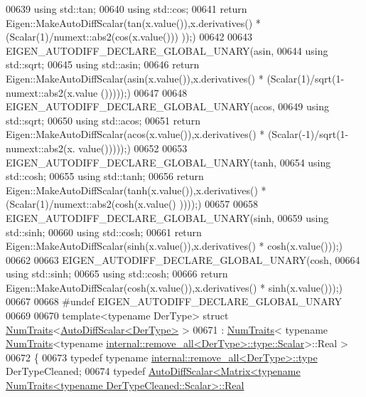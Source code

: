 \begin{DoxyCode}
00639   \textcolor{keyword}{using} std::tan;
00640   \textcolor{keyword}{using} std::cos;
00641   \textcolor{keywordflow}{return} Eigen::MakeAutoDiffScalar(tan(x.value()),x.derivatives() * (Scalar(1)/numext::abs2(cos(x.value()))
      ));)
00642 
00643 EIGEN\_AUTODIFF\_DECLARE\_GLOBAL\_UNARY(asin,
00644   \textcolor{keyword}{using} std::sqrt;
00645   \textcolor{keyword}{using} std::asin;
00646   \textcolor{keywordflow}{return} Eigen::MakeAutoDiffScalar(asin(x.value()),x.derivatives() * (Scalar(1)/sqrt(1-numext::abs2(x.value
      ()))));)
00647   
00648 EIGEN\_AUTODIFF\_DECLARE\_GLOBAL\_UNARY(acos,
00649   \textcolor{keyword}{using} std::sqrt;
00650   \textcolor{keyword}{using} std::acos;
00651   \textcolor{keywordflow}{return} Eigen::MakeAutoDiffScalar(acos(x.value()),x.derivatives() * (Scalar(-1)/sqrt(1-numext::abs2(x.
      value()))));)
00652 
00653 EIGEN\_AUTODIFF\_DECLARE\_GLOBAL\_UNARY(tanh,
00654   \textcolor{keyword}{using} std::cosh;
00655   \textcolor{keyword}{using} std::tanh;
00656   \textcolor{keywordflow}{return} Eigen::MakeAutoDiffScalar(tanh(x.value()),x.derivatives() * (Scalar(1)/numext::abs2(cosh(x.value()
      ))));)
00657 
00658 EIGEN\_AUTODIFF\_DECLARE\_GLOBAL\_UNARY(sinh,
00659   \textcolor{keyword}{using} std::sinh;
00660   \textcolor{keyword}{using} std::cosh;
00661   \textcolor{keywordflow}{return} Eigen::MakeAutoDiffScalar(sinh(x.value()),x.derivatives() * cosh(x.value()));)
00662 
00663 EIGEN\_AUTODIFF\_DECLARE\_GLOBAL\_UNARY(cosh,
00664   \textcolor{keyword}{using} std::sinh;
00665   \textcolor{keyword}{using} std::cosh;
00666   \textcolor{keywordflow}{return} Eigen::MakeAutoDiffScalar(cosh(x.value()),x.derivatives() * sinh(x.value()));)
00667 
00668 #undef EIGEN\_AUTODIFF\_DECLARE\_GLOBAL\_UNARY
00669 
00670 template<typename DerType> \textcolor{keyword}{struct} \hyperlink{group___core___module_struct_eigen_1_1_num_traits}{NumTraits}<\hyperlink{class_eigen_1_1_auto_diff_scalar}{AutoDiffScalar<DerType>} >
00671   : \hyperlink{group___core___module_struct_eigen_1_1_num_traits}{NumTraits}< \textcolor{keyword}{typename} \hyperlink{group___core___module_struct_eigen_1_1_num_traits}{NumTraits}<\textcolor{keyword}{typename} 
      \hyperlink{struct_eigen_1_1internal_1_1remove__all}{internal::remove\_all<DerType>::type::Scalar}>::Real >
00672 \{
00673   \textcolor{keyword}{typedef} \textcolor{keyword}{typename} \hyperlink{group___sparse_core___module}{internal::remove\_all<DerType>::type} DerTypeCleaned;
00674   \textcolor{keyword}{typedef} 
      \hyperlink{class_eigen_1_1_auto_diff_scalar}{AutoDiffScalar<Matrix<typename NumTraits<typename DerTypeCleaned::Scalar>::Real}

\end{DoxyCode}
